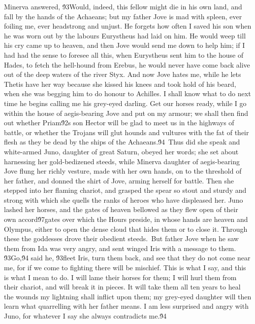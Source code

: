 {Minerva answered, \'93Would, indeed, this fellow might die in his own land, and fall by the hands of the Achaeans; but my father Jove is mad with spleen, ever foiling me, ever headstrong and unjust. He forgets how often I saved his son when he was worn out by the labours Eurystheus had laid on him. He would weep till his cry came up to heaven, and then Jove would send me down to help him; if I had had the sense to foresee all this, when Eurystheus sent him to the house of Hades, to fetch the hell-hound from Erebus, he would never have come back alive out of the deep waters of the river Styx. And now Jove hates me, while he lets Thetis have her way because she kissed his knees and took hold of his beard, when she was begging him to do honour to Achilles. I shall know what to do next time he begins calling me his grey-eyed darling. Get our horses ready, while I go within the house of aegis-bearing Jove and put on my armour; we shall then find out whether Priam\'92s son Hector will be glad to meet us in the highways of battle, or whether the Trojans will glut hounds and vultures with the fat of their flesh as they be dead by the ships of the Achaeans.\'94\
Thus did she speak and white-armed Juno, daughter of great Saturn, obeyed her words; she set about harnessing her gold-bedizened steeds, while Minerva daughter of aegis-bearing Jove flung her richly vesture, made with her own hands, on to the threshold of her father, and donned the shirt of Jove, arming herself for battle. Then she stepped into her flaming chariot, and grasped the spear so stout and sturdy and strong with which she quells the ranks of heroes who have displeased her. Juno lashed her horses, and the gates of heaven bellowed as they flew open of their own accord\'97gates over which the Hours preside, in whose hands are heaven and Olympus, either to open the dense cloud that hides them or to close it. Through these the goddesses drove their obedient steeds.\
But father Jove when he saw them from Ida was very angry, and sent winged Iris with a message to them. \'93Go,\'94 said he, \'93fleet Iris, turn them back, and see that they do not come near me, for if we come to fighting there will be mischief. This is what I say, and this is what I mean to do. I will lame their horses for them; I will hurl them from their chariot, and will break it in pieces. It will take them all ten years to heal the wounds my lightning shall inflict upon them; my grey-eyed daughter will then learn what quarrelling with her father means. I am less surprised and angry with Juno, for whatever I say she always contradicts me.\'94\
}
